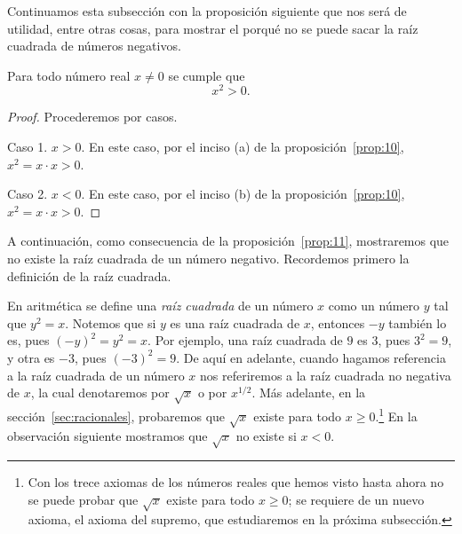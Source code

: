 \documentclass[12pt,a4paper]{book}
\begin{document}
    Continuamos esta subsección con la proposición siguiente que nos será de
    utilidad, entre otras cosas, para mostrar el porqué no se puede sacar la raíz
    cuadrada de números negativos.

    \begin{proposicion}\label{prop:11}
        Para todo número real $x\neq 0$ se cumple que
        \begin{equation*}
            x^{2}>0.
        \end{equation*}
    \end{proposicion}

    \begin{proof}
        Procederemos por casos.

        Caso 1. $x>0$. En este caso, por el inciso (a) de la proposición~\ref{prop:10}, $x^{2}=x\cdot x>0$.

        Caso 2. $x<0$. En este caso, por el inciso (b) de la proposición~\ref{prop:10}, $x^{2}=x\cdot x>0$.
    \end{proof}

    A continuación, como consecuencia de la proposición~\ref{prop:11}, mostraremos que
    no existe la raíz cuadrada de un número negativo. Recordemos primero la
    definición de la raíz cuadrada.

    En aritmética se define una \textit{raíz cuadrada} de un número $x$ como un número
    $y$ tal que $y^{2}=x$. Notemos que si $y$ es una raíz cuadrada de $x$, entonces $-y$
    también lo es, pues $(-y)^{2}=y^{2}=x$. Por ejemplo, una raíz cuadrada de $9$ es
    $3$, pues $3^{2}=9$, y otra es $-3$, pues $(-3)^{2}=9$. De aquí en adelante, cuando
    hagamos referencia a la raíz cuadrada de un número $x$ nos referiremos a la
    raíz cuadrada no negativa de $x$, la cual denotaremos por $\sqrt{x}$ o por $x^{1/2}$. Más
    adelante, en la sección~\ref{sec:racionales}, probaremos que $\sqrt{x}$ existe para todo $x\geq 0$.\footnote{Con los trece axiomas de los números reales que hemos visto hasta ahora no se puede
    probar que $\sqrt{x}$ existe para todo $x\geq 0$; se requiere de un nuevo axioma, el axioma del
    supremo, que estudiaremos en la próxima subsección.} En
    la observación siguiente mostramos que $\sqrt{x}$ no existe si $x<0$.
\end{document}
